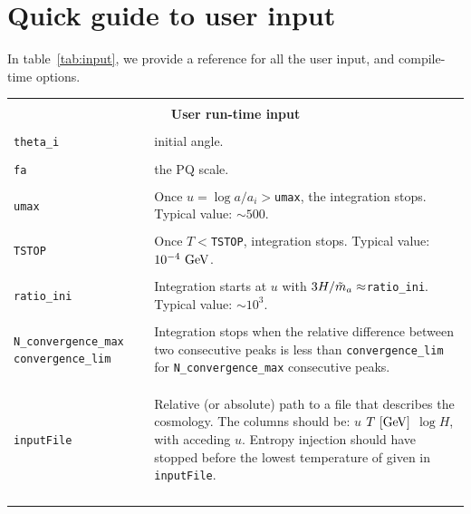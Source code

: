 \documentclass[11pt,a4paper]{article}
\begin{document}
\section{Quick guide to user input}\label{app:usr_input}
\setcounter{equation}{0}
In table~\ref{tab:input}, we provide a reference for all the user input, and compile-time options.
%
\begin{table}[h!]
	\centering
	\begin{tabular}{l l}
		\hline\\[-0.4cm]
		\multicolumn{2}{c}{\bf User run-time input}  \\
		\hline\\[-0.4cm]

		{\tt theta\_i} & initial angle.  \\
		\hline\\[-0.4cm]

		{\tt fa} & the PQ scale.\\
		\hline\\[-0.4cm]

		{\tt umax } & Once $u=\log a/a_i>${\tt umax}, the integration stops. Typical value: $\sim 500$.\\
		\hline\\[-0.4cm]

		{\tt TSTOP} & Once $T<${\tt TSTOP}, integration stops. Typical value: $10^{-4}~{\rm GeV}$.\\
		\hline\\[-0.4cm]

 		{\tt ratio\_ini}& Integration starts at $u$ with $3H/\tilde m_{a}{} \approx${\tt ratio\_ini}. Typical value: $\sim 10^{3}$.\\
		\hline\\[-0.4cm]

		\multirow{1}{4cm}{{\tt N\_convergence\_max} {\tt convergence\_lim}} & \multirow{1}{12cm}{Integration stops when  the relative difference 
		between two consecutive peaks  is less than {\tt convergence\_lim} for {\tt N\_convergence\_max} 
		consecutive peaks. } \\ \\ \\ 
		\hline\\[-0.4cm]

		{\tt inputFile} & \multirow{1}{12cm}{Relative (or absolute) path to a file that describes the cosmology. The columns should be: $u$ $T ~[{\rm GeV}]$ $\log H$, with acceding $u$. Entropy injection should have stopped before the lowest temperature of given in {\tt inputFile}.} \\ \\  \\ \\
		\hline\\[-0.4cm]


\end{tabular}
\end{table}
\end{document}
